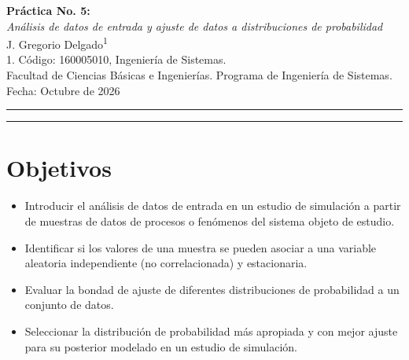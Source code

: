 \documentclass[11pt,a4paper]{article}
\newcommand{\TituloInforme}{Práctica No. 5:}
\newcommand{\NombrePractica}{Análisis de datos de entrada y ajuste de datos a distribuciones de probabilidad}
\newcommand{\NombreFacultad}{Facultad de Ciencias Básicas e Ingenierías}
\newcommand{\NombrePrograma}{Programa de Ingeniería de Sistemas}
\newcommand{\FechaInforme}{Octubre de 2026}
\newcommand{\AlumnoUno}{J. Gregorio Delgado}
\newcommand{\CodUno}{160005010}
\begin{document}
\begin{center}
 {\LARGE\bfseries \TituloInforme}\\[6pt]
 {\normalsize\itshape \NombrePractica}\\[16pt]
 {\large \AlumnoUno\textsuperscript{1}}\\[12pt]
 {\small 1. Código: \CodUno, Ingeniería de Sistemas.}\\[10pt]
 {\small \NombreFacultad. \NombrePrograma.}\\[4pt]
 {\small Fecha: \FechaInforme}
\end{center}

\vspace{.4cm}\noindent\rule{\textwidth}{.6pt}
\begin{abstract}
Se analizaron cuatro muestras de 200 observaciones (A, B, C y D) de procesos estocásticos,
interpretadas como tiempos entre llegadas, siguiendo el capítulo 3 de Banks \cite{banks1998}.
Primero se describieron con estadística descriptiva e histogramas. Después se evaluaron los
supuestos de independencia y estabilidad con correlaciones de retraso, diagramas de dispersión,
patrón de llegadas, conteos por intervalo y media móvil, complementados con pruebas de
Ljung-Box, rachas, Spearman y Kruskal-Wallis. Por último, se ajustaron nueve distribuciones por
máxima verosimilitud y se compararon con SSE, AIC y BIC. B y D son IID y se modelan con una
Exponencial de media 0,205 y una Lognormal ($\sigma=1{,}019$, escala 1,273). A es estacionario
pero autocorrelacionado ($r_1=0{,}52$): su marginal es aproximadamente Normal y se reproduce
con un AR(1) de innovaciones uniformes. C no es estacionario: su media crece linealmente con el
orden de observación y, al normalizar por esa tendencia, los datos son IID exponenciales. La
Gamma que mejor ajusta los datos agregados de C es solo un efecto de mezclar escalas.

\medskip\noindent\textbf{Palabras clave ---} análisis de datos de entrada, IID, autocorrelación,
estacionariedad, bondad de ajuste, máxima verosimilitud, AIC, BIC.
\end{abstract}
\rule{\textwidth}{.6pt}

\section{Objetivos}
\begin{itemize}
 \item Introducir el análisis de datos de entrada en un estudio de simulación a partir de muestras
 de datos de procesos o fenómenos del sistema objeto de estudio.
 \item Identificar si los valores de una muestra se pueden asociar a una variable aleatoria
 independiente (no correlacionada) y estacionaria.
 \item Evaluar la bondad de ajuste de diferentes distribuciones de probabilidad a un conjunto de datos.
 \item Seleccionar la distribución de probabilidad más apropiada y con mejor ajuste para su
 posterior modelado en un estudio de simulación.
\end{itemize}
\end{document}
